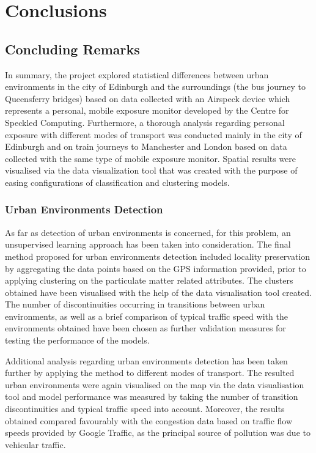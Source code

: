 \documentclass[bsc,frontabs,twoside,singlespacing, parskip,deptreport]{infthesis}     %
\begin{document}
\chapter{Conclusions}

\section{Concluding Remarks}

In summary, the project explored statistical differences between urban environments in the city of Edinburgh and the surroundings (the bus journey to Queensferry bridges) based on data collected with an Airspeck device which represents a personal, mobile exposure monitor developed by the Centre for Speckled Computing. Furthermore, a thorough analysis regarding personal exposure with different modes of transport was conducted mainly in the city of Edinburgh and on train journeys to Manchester and London based on data collected with the same type of mobile exposure monitor. Spatial results were visualised via the data visualization tool that was created with the purpose of easing configurations of classification and clustering models.

\subsection{Urban Environments Detection}

As far as detection of urban environments is concerned, for this problem, an unsupervised learning approach has been taken into consideration. The final method proposed for urban environments detection included locality preservation by aggregating the data points based on the GPS information provided, prior to applying clustering on the particulate matter related attributes. The clusters obtained have been visualised with the help of the data visualisation tool created. The number of discontinuities occurring in transitions between urban environments, as well as a brief comparison of typical traffic speed with the environments obtained have been chosen as further validation measures for testing the performance of the models.

Additional analysis regarding urban environments detection has been taken further by applying the method to different modes of transport. The resulted urban environments were again visualised on the map via the data visualisation tool and model performance was measured by taking the number of transition discontinuities and typical traffic speed into account. Moreover, the results obtained compared favourably with the congestion data based on traffic flow speeds provided by Google Traffic, as the principal source of pollution was due to vehicular traffic.
\end{document}
